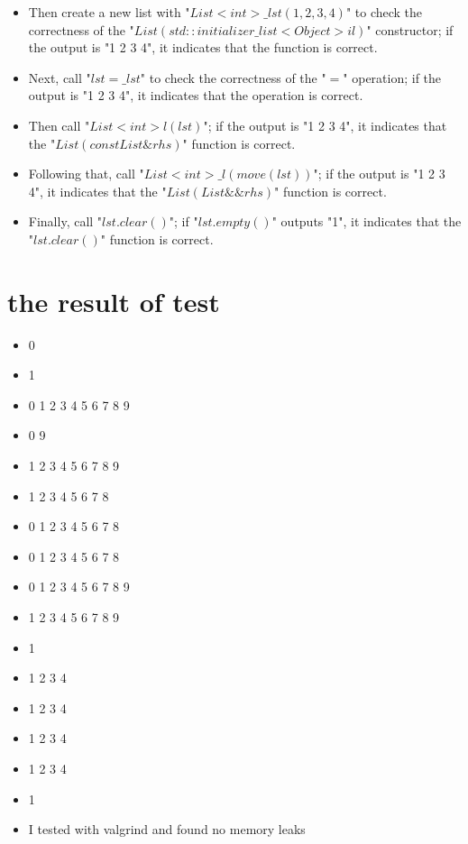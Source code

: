 \documentclass[a4paper]{article}
\begin{document}
\begin{itemize}
 \item Then create a new list with "$List<int> \_lst({1,2,3,4})$" to check the correctness of the "$List(std::initializer\_list<Object> il)$" constructor; if the output is "1 2 3 4", it indicates that the function is correct.

 \item Next, call "$lst = \_lst$" to check the correctness of the "$=$" operation; if the output is "1 2 3 4", it indicates that the operation is correct.

 \item Then call "$List<int> l(lst)$"; if the output is "1 2 3 4", it indicates that the "$List(const List \&rhs)$" function is correct.

 \item Following that, call "$List<int> \_l(move(lst))$"; if the output is "1 2 3 4", it indicates that the "$List(List \&\&rhs)$" function is correct.

 \item Finally, call "$lst.clear()$"; if "$lst.empty()$" outputs "1", it indicates that the "$lst.clear()$" function is correct.
\end{itemize}

\section*{the result of test}
\begin{itemize}
 \item 0
 \item 1
 \item 0 1 2 3 4 5 6 7 8 9 
 \item 0 9
 \item 1 2 3 4 5 6 7 8 9
 \item 1 2 3 4 5 6 7 8
 \item 0 1 2 3 4 5 6 7 8
 \item 0 1 2 3 4 5 6 7 8
 \item 0 1 2 3 4 5 6 7 8 9
 \item 1 2 3 4 5 6 7 8 9
 \item 1
 \item 1 2 3 4
 \item 1 2 3 4
 \item 1 2 3 4
 \item 1 2 3 4
 \item 1
 \item I tested with valgrind and found no memory leaks
\end{itemize}
\end{document}
